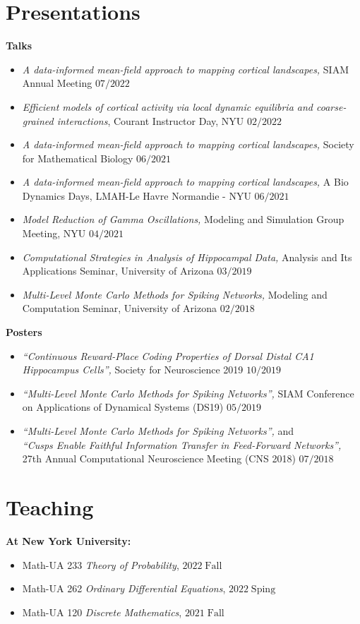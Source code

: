 \documentclass[margin, 11pt]{res} %
\begin{document}
\begin{resume}
\section{Presentations}
\label{Presentations}
{\bf Talks}
\begin{itemize}
\item \textit{A data-informed mean-field approach to mapping cortical landscapes,} 
SIAM Annual Meeting \hfill $07/2022$
\item \textit{Efficient models of cortical activity via local dynamic equilibria and coarse-grained interactions}, Courant Instructor Day, NYU \hfill $02/2022$
\item \textit{A data-informed mean-field approach to mapping cortical landscapes,} 
Society for Mathematical Biology \hfill $06/2021$
\item \textit{A data-informed mean-field approach to mapping cortical landscapes,} 
A Bio Dynamics Days, LMAH-Le Havre Normandie - NYU \hfill $06/2021$
\item \textit{Model Reduction of Gamma Oscillations,} 
Modeling and Simulation Group Meeting, NYU \hfill $04/2021$
\item \textit{Computational Strategies in Analysis of Hippocampal Data,} 
Analysis and Its Applications Seminar, University of Arizona \hfill $03/2019$
\item \textit{Multi-Level Monte Carlo Methods for Spiking Networks,} 
Modeling and Computation Seminar, University of Arizona \hfill $02/2018$
\end{itemize}

{\bf Posters}
\begin{itemize}
\item \textit{“Continuous Reward-Place Coding Properties of Dorsal Distal CA1 Hippocampus Cells”,}
Society for Neuroscience 2019  \hfill $10/2019$
\item \textit{“Multi-Level Monte Carlo Methods for Spiking Networks”,} 
SIAM Conference on Applications of Dynamical Systems (DS19) \hfill $05/2019$
\item \textit{“Multi-Level Monte Carlo Methods for Spiking Networks”,} and \\
\textit{ “Cusps Enable Faithful Information Transfer in Feed-Forward Networks”,}
27th Annual Computational Neuroscience Meeting (CNS 2018) \hfill $07/2018$
\end{itemize}


\section{Teaching}
{\bf At New York University:}
\begin{itemize}
\item Math-UA 233 {\sl Theory of Probability}, \hfill $2022\;\mathrm{Fall}$ 
\item Math-UA 262 {\sl Ordinary Differential Equations}, \hfill $2022\;\mathrm{Sping}$ 
\item Math-UA 120 {\sl Discrete Mathematics}, \hfill $2021\;\mathrm{Fall}$
\end{itemize}


\end{resume}
\end{document}
